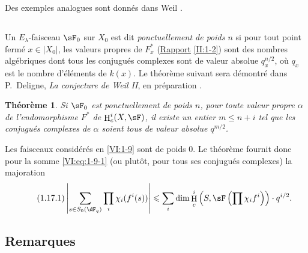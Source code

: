 \documentclass[oneside]{book}
\DeclareMathOperator{\h}{H}
\theoremstyle{sga-source}
\theoremstyle{sga-source-dash}
\theoremstyle{sga-source-dotdash}
\theoremstyle{sga-source-number-note-dash}
\theoremstyle{sga-source-note-number-dotdash}
\theoremstyle{sga-source-example-dotdash}
\theoremstyle{sga-source-inline-number}
\theoremstyle{sga-source-bare-number}
\theoremstyle{sga-source}
\newtheorem{theorem_}[subsection]{Théorème}
\newcommand{\PrintPage}[1]{}\newcommand{\MathPage}[1]{}\newcommand{\PrintCite}[2]{#1}\newcommand{\var}[3]{#1}
\begin{document}
Des exemples analogues sont donnés dans Weil \cite[App V, $3^\text{e}$ éd.]{we74}. 





\subsection{}\label{VI:1-16}

Un $E_\lambda$-faisceau $\sF_0$ sur $X_0$ est dit \emph{ponctuellement de 
poids $n$} si pour tout point fermé $x\in |X_0|$, les valeurs propres de 
$F_x^\ast$ (\hyperref[II]{Rapport} \ref{II:1-2}) sont des nombres algébriques 
dont tous les conjugués complexes sont de valeur absolue 
$q_x^{n/2}$, où $q_x$ est le nombre d'éléments de $k(x)$. Le théorème 
suivant sera démontré dans P.~Deligne, \emph{La conjecture de Weil II}, en préparation \cite{de80}. 





\PrintPage{178}
\begin{theorem_}\label{VI:1-17}
Si $\sF_0$ est ponctuellement de poids $n$, pour toute valeur propre $\alpha$ 
de l'endomorphisme $F^\ast$ de $\h_c^i(X,\sF)$, il existe un entier 
$m\leqslant n+i$ tel que les conjugués complexes de $\alpha$ soient tous de 
valeur absolue $q^{m/2}$.
\end{theorem_}

Les faisceaux considérés en \ref{VI:1-9} sont de poids $0$. Le théorème 
fournit donc pour la somme \ref{VI:eq:1-9-1} (ou plutôt, pour tous ses 
conjugués complexes) la majoration 
\begin{equation*}\tag{1.17.1}\label{VI:eq:1-17-1}
  \left|\sum_{s\in S_0(\dF_q)} \prod_i \chi_i(f^i(s)) \right| \leqslant \sum_i \dim \h_c^i\left(S,\sF\left(\prod \chi_i f^i\right)\right)\cdot q^{i/2} \text{.}
\end{equation*}





\subsection{Remarques}\label{VI:1-18}
\end{document}
